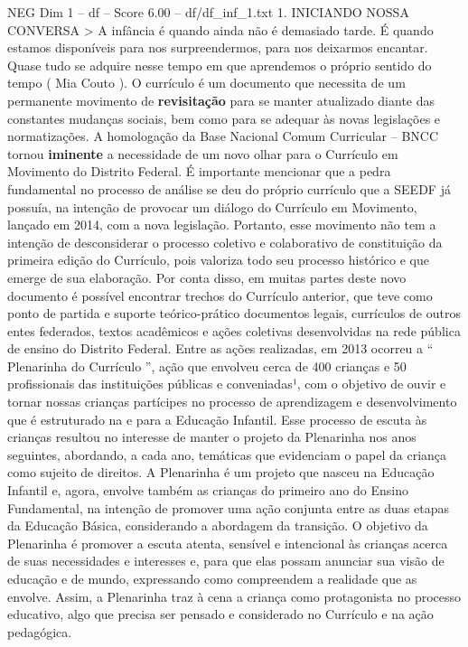 \begin{textsample}{NEG Dim 1 – df – Score 6.00 – df/df\_inf\_1.txt}  \label{ex:f1_neg_170}
1.
INICIANDO NOSSA CONVERSA > A infância é quando ainda não é demasiado tarde.
É quando estamos disponíveis para nos surpreendermos, para nos deixarmos encantar.
Quase tudo se adquire nesse tempo em que aprendemos o próprio sentido do tempo ( Mia Couto ).
O currículo é um documento que necessita de um permanente movimento de \textbf{revisitação} para se manter atualizado diante das constantes mudanças sociais, bem como para se adequar às novas legislações e normatizações.
A homologação da Base Nacional Comum Curricular – BNCC tornou \textbf{iminente} a necessidade de um novo olhar para o Currículo em Movimento do Distrito Federal.
É importante mencionar que a pedra fundamental no processo de análise se deu do próprio currículo que a SEEDF já possuía, na intenção de provocar um diálogo do Currículo em Movimento, lançado em 2014, com a nova legislação.
Portanto, esse movimento não tem a intenção de desconsiderar o processo coletivo e colaborativo de constituição da primeira edição do Currículo, pois valoriza todo seu processo histórico e que emerge de sua elaboração.
Por conta disso, em muitas partes deste novo documento é possível encontrar trechos do Currículo anterior, que teve como ponto de partida e suporte teórico-prático documentos legais, currículos de outros entes federados, textos acadêmicos e ações coletivas desenvolvidas na rede pública de ensino do Distrito Federal.
Entre as ações realizadas, em 2013 ocorreu a “ Plenarinha do Currículo ”, ação que envolveu cerca de 400 crianças e 50 profissionais das instituições públicas e conveniadas¹, com o objetivo de ouvir e tornar nossas crianças partícipes no processo de aprendizagem e desenvolvimento que é estruturado na e para a Educação Infantil.
Esse processo de escuta às crianças resultou no interesse de manter o projeto da Plenarinha nos anos seguintes, abordando, a cada ano, temáticas que evidenciam o papel da criança como sujeito de direitos.
A Plenarinha é um projeto que nasceu na Educação Infantil e, agora, envolve também as crianças do primeiro ano do Ensino Fundamental, na intenção de promover uma ação conjunta entre as duas etapas da Educação Básica, considerando a abordagem da transição.
O objetivo da Plenarinha é promover a escuta atenta, sensível e intencional às crianças acerca de suas necessidades e interesses e, para que elas possam anunciar sua visão de educação e de mundo, expressando como compreendem a realidade que as envolve.
Assim, a Plenarinha traz à cena a criança como protagonista no processo educativo, algo que precisa ser pensado e considerado no Currículo e na ação pedagógica.

\end{textsample}
